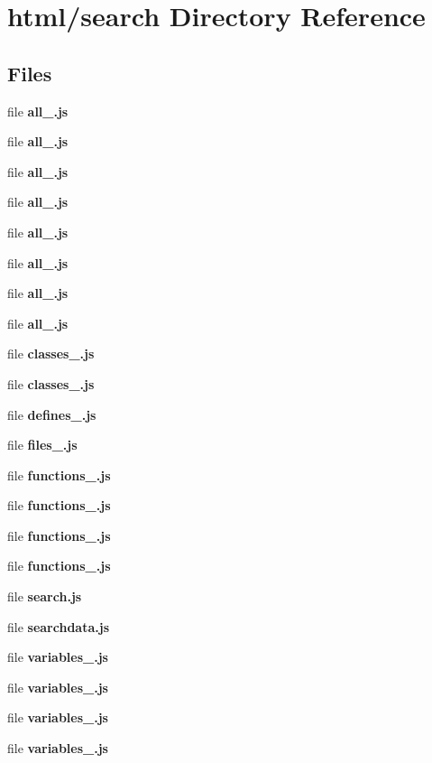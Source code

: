 \section{html/search Directory Reference}
\label{dir_ddeed1b19b98904c6aa1b48c4ffa871b}
\subsection*{Files}
\begin{DoxyCompactItemize}
\item 
file {\bf all\+\_.\+js}
\item 
file {\bf all\+\_.\+js}
\item 
file {\bf all\+\_.\+js}
\item 
file {\bf all\+\_.\+js}
\item 
file {\bf all\+\_.\+js}
\item 
file {\bf all\+\_.\+js}
\item 
file {\bf all\+\_.\+js}
\item 
file {\bf all\+\_.\+js}
\item 
file {\bf classes\+\_.\+js}
\item 
file {\bf classes\+\_.\+js}
\item 
file {\bf defines\+\_.\+js}
\item 
file {\bf files\+\_.\+js}
\item 
file {\bf functions\+\_.\+js}
\item 
file {\bf functions\+\_.\+js}
\item 
file {\bf functions\+\_.\+js}
\item 
file {\bf functions\+\_.\+js}
\item 
file {\bf search.\+js}
\item 
file {\bf searchdata.\+js}
\item 
file {\bf variables\+\_.\+js}
\item 
file {\bf variables\+\_.\+js}
\item 
file {\bf variables\+\_.\+js}
\item 
file {\bf variables\+\_.\+js}
\end{DoxyCompactItemize}
